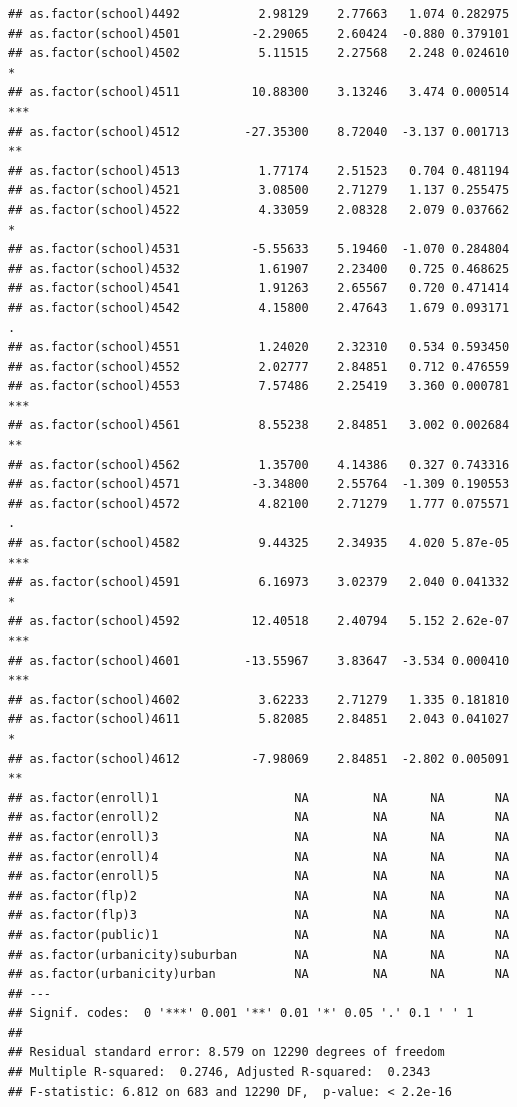 \documentclass[ignorenonframetext,]{beamer}
\begin{document}
\begin{frame}[fragile]{}
\begin{verbatim}
## as.factor(school)4492           2.98129    2.77663   1.074 0.282975    
## as.factor(school)4501          -2.29065    2.60424  -0.880 0.379101    
## as.factor(school)4502           5.11515    2.27568   2.248 0.024610 *  
## as.factor(school)4511          10.88300    3.13246   3.474 0.000514 ***
## as.factor(school)4512         -27.35300    8.72040  -3.137 0.001713 ** 
## as.factor(school)4513           1.77174    2.51523   0.704 0.481194    
## as.factor(school)4521           3.08500    2.71279   1.137 0.255475    
## as.factor(school)4522           4.33059    2.08328   2.079 0.037662 *  
## as.factor(school)4531          -5.55633    5.19460  -1.070 0.284804    
## as.factor(school)4532           1.61907    2.23400   0.725 0.468625    
## as.factor(school)4541           1.91263    2.65567   0.720 0.471414    
## as.factor(school)4542           4.15800    2.47643   1.679 0.093171 .  
## as.factor(school)4551           1.24020    2.32310   0.534 0.593450    
## as.factor(school)4552           2.02777    2.84851   0.712 0.476559    
## as.factor(school)4553           7.57486    2.25419   3.360 0.000781 ***
## as.factor(school)4561           8.55238    2.84851   3.002 0.002684 ** 
## as.factor(school)4562           1.35700    4.14386   0.327 0.743316    
## as.factor(school)4571          -3.34800    2.55764  -1.309 0.190553    
## as.factor(school)4572           4.82100    2.71279   1.777 0.075571 .  
## as.factor(school)4582           9.44325    2.34935   4.020 5.87e-05 ***
## as.factor(school)4591           6.16973    3.02379   2.040 0.041332 *  
## as.factor(school)4592          12.40518    2.40794   5.152 2.62e-07 ***
## as.factor(school)4601         -13.55967    3.83647  -3.534 0.000410 ***
## as.factor(school)4602           3.62233    2.71279   1.335 0.181810    
## as.factor(school)4611           5.82085    2.84851   2.043 0.041027 *  
## as.factor(school)4612          -7.98069    2.84851  -2.802 0.005091 ** 
## as.factor(enroll)1                   NA         NA      NA       NA    
## as.factor(enroll)2                   NA         NA      NA       NA    
## as.factor(enroll)3                   NA         NA      NA       NA    
## as.factor(enroll)4                   NA         NA      NA       NA    
## as.factor(enroll)5                   NA         NA      NA       NA    
## as.factor(flp)2                      NA         NA      NA       NA    
## as.factor(flp)3                      NA         NA      NA       NA    
## as.factor(public)1                   NA         NA      NA       NA    
## as.factor(urbanicity)suburban        NA         NA      NA       NA    
## as.factor(urbanicity)urban           NA         NA      NA       NA    
## ---
## Signif. codes:  0 '***' 0.001 '**' 0.01 '*' 0.05 '.' 0.1 ' ' 1
## 
## Residual standard error: 8.579 on 12290 degrees of freedom
## Multiple R-squared:  0.2746, Adjusted R-squared:  0.2343 
## F-statistic: 6.812 on 683 and 12290 DF,  p-value: < 2.2e-16
\end{verbatim}

\end{frame}
\end{document}
